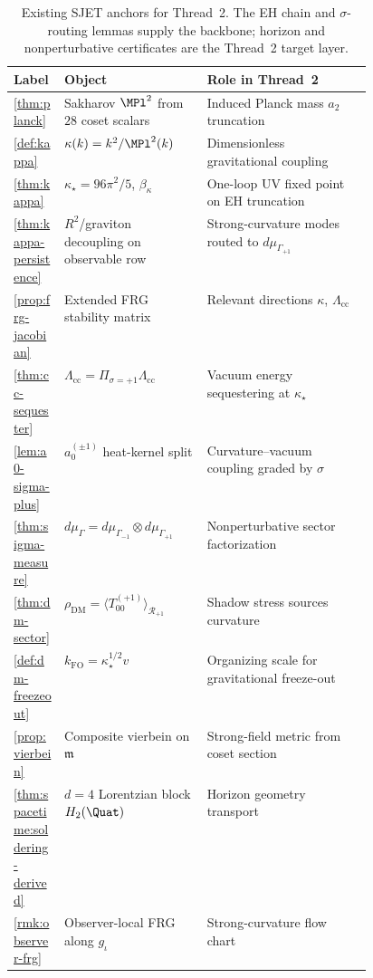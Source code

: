 \begin{table}[ht]
\centering
\small
\renewcommand{\arraystretch}{1.08}
\begin{tabular}{@{}llp{0.46\linewidth}@{}}
\toprule
\textbf{Label} & \textbf{Object} & \textbf{Role in Thread~2} \\
\midrule
\ref{thm:planck} &
  Sakharov $\MPl^2$ from $28$ coset scalars &
  Induced Planck mass $a_2$ truncation \\
\ref{def:kappa} &
  $\kappa(k)=k^2/\MPl^2(k)$ &
  Dimensionless gravitational coupling \\
\ref{thm:kappa} &
  $\kappa_\star=96\pi^2/5$, $\beta_\kappa$ &
  One-loop UV fixed point on EH truncation \\
\ref{thm:kappa-persistence} &
  $R^2$/graviton decoupling on observable row &
  Strong-curvature modes routed to $d\mu_{\Gamma_{+1}}$ \\
\ref{prop:frg-jacobian} &
  Extended FRG stability matrix &
  Relevant directions $\kappa$, $\Lambda_{\mathrm{cc}}$ \\
\ref{thm:cc-sequester} &
  $\Lambda_{\mathrm{cc}}=\Pi_{\sigma=+1}\Lambda_{\mathrm{cc}}$ &
  Vacuum energy sequestering at $\kappa_\star$ \\
\ref{lem:a0-sigma-plus} &
  $a_0^{(\pm1)}$ heat-kernel split &
  Curvature--vacuum coupling graded by $\sigma$ \\
\ref{thm:sigma-measure} &
  $d\mu_\Gamma=d\mu_{\Gamma_{-1}}\otimes d\mu_{\Gamma_{+1}}$ &
  Nonperturbative sector factorization \\
\ref{thm:dm-sector} &
  $\rho_{\mathrm{DM}}=\langle T_{00}^{(+1)}\rangle_{\mathcal{R}_{+1}}$ &
  Shadow stress sources curvature \\
\ref{def:dm-freezeout} &
  $k_{\mathrm{FO}}=\kappa_\star^{1/2}v$ &
  Organizing scale for gravitational freeze-out \\
\ref{prop:vierbein} &
  Composite vierbein on $\mathfrak{m}$ &
  Strong-field metric from coset section \\
\ref{thm:spacetime:soldering-derived} &
  $d=4$ Lorentzian block $H_2(\Quat)$ &
  Horizon geometry transport \\
\ref{rmk:observer-frg} &
  Observer-local FRG along $g_\iota$ &
  Strong-curvature flow chart \\
\bottomrule
\end{tabular}
\caption{Existing SJET anchors for Thread~2. The EH chain and
$\sigma$-routing lemmas supply the backbone; horizon and nonperturbative
certificates are the Thread~2 target layer.}
\label{tab:thread-2-anchors}
\end{table}

